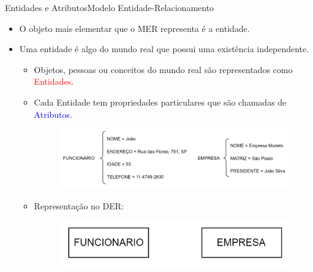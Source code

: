 \documentclass[t]{beamer}
\begin{document}

\begin{ftst}{Entidades e Atributos}{Modelo Entidade-Relacionamento}
\small
\begin{itemize}
    \item O objeto mais elementar que o MER representa é a entidade. 
    \item Uma entidade é algo do mundo real que possui uma existência independente. 
    \begin{itemize}
        \item Objetos, pessoas ou conceitos do mundo real são representados como \textcolor{red}{Entidades}.
        \item Cada Entidade tem propriedades particulares que são chamadas de \textcolor{blue}{Atributos}.
        \begin{figure}
            \centering
            \includegraphics[scale=0.1]{Figuras/01_2.png}
        \end{figure}
        \item Representação no DER:
        \begin{figure}
            \includegraphics[scale=0.15]{Figuras/01_4.png}
        \end{figure}
    \end{itemize}

\end{itemize}


\end{ftst}

\end{document}
